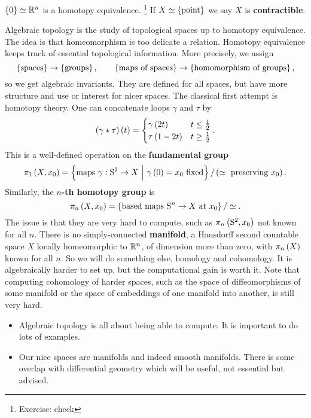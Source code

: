 \begin{example*}
$ \cbr{0} \simeq \RR^n $ is a homotopy equivalence. \footnote{Exercise: check} If $ X \simeq \pt $ we say $ X $ is \textbf{contractible}.
\end{example*}

Algebraic topology is the study of topological spaces up to homotopy equivalence. The idea is that homeomorphism is too delicate a relation. Homotopy equivalence keeps track of essential topological information. More precisely, we assign
$$ \cbr{\text{spaces}} \to \cbr{\text{groups}}, \qquad \cbr{\text{maps of spaces}} \to \cbr{\text{homomorphism of groups}}, $$
so we get algebraic invariants. They are defined for all spaces, but have more structure and use or interest for nicer spaces. The classical first attempt is homotopy theory. One can concatenate loops $ \gamma $ and $ \tau $ by
$$ \br{\gamma * \tau}\br{t} =
\begin{cases}
\gamma\br{2t} & t \le \tfrac{1}{2} \\
\tau\br{1 - 2t} & t \ge \tfrac{1}{2}
\end{cases}.
$$
This is a well-defined operation on the \textbf{fundamental group}
$$ \pi_1\br{X, x_0} = \cbr{\text{maps} \ \gamma : \S^1 \to X \st \gamma\br{0} = x_0 \ \text{fixed}} / \br{\simeq \ \text{preserving} \ x_0}. $$
Similarly, the \textbf{$ n $-th homotopy group} is
$$ \pi_n\br{X, x_0} = \cbr{\text{based maps} \ \S^n \to X \ \text{at} \ x_0} / \simeq. $$
The issue is that they are very hard to compute, such as $ \pi_n\br{\S^2, x_0} $ not known for all $ n $. There is no simply-connected \textbf{manifold}, a Hausdorff second countable space $ X $ locally homeomorphic to $ \mathbb{R}^n $, of dimension more than zero, with $ \pi_n\br{X} $ known for all $ n $. So we will do something else, homology and cohomology. It is algebraically harder to set up, but the computational gain is worth it. Note that computing cohomology of harder spaces, such as the space of diffeomorphisms of some manifold or the space of embeddings of one manifold into another, is still very hard.

\begin{remark*}
\hfill
\begin{itemize}
\item Algebraic topology is all about being able to compute. It is important to do lots of examples.
\item Our nice spaces are manifolds and indeed smooth manifolds. There is some overlap with differential geometry which will be useful, not essential but advised.
\end{itemize}
\end{remark*}

